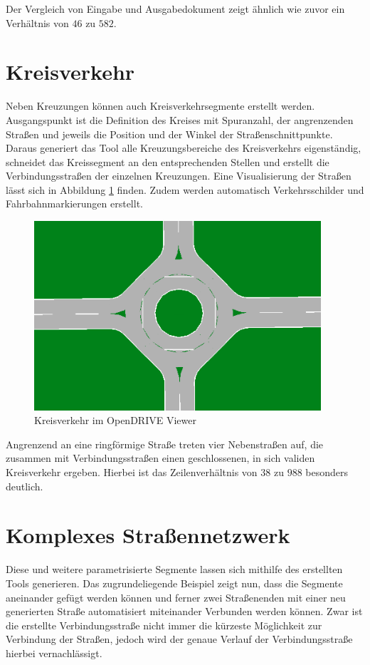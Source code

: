 Der Vergleich von Eingabe und Ausgabedokument zeigt ähnlich wie zuvor ein Verhältnis von \(46\) zu \(582\). 

\section{Kreisverkehr}
Neben Kreuzungen können auch Kreisverkehrsegmente erstellt werden. Ausgangspunkt ist die Definition des Kreises mit Spuranzahl, der angrenzenden Straßen und jeweils die Position und der Winkel der Straßenschnittpunkte. Daraus generiert das Tool alle Kreuzungsbereiche des Kreisverkehrs eigenständig, schneidet das Kreissegment an den entsprechenden Stellen und erstellt die Verbindungsstraßen der einzelnen Kreuzungen. Eine Visualisierung der Straßen lässt sich in Abbildung \ref{abb8} finden. Zudem werden automatisch Verkehrsschilder und Fahrbahnmarkierungen erstellt.

\begin{figure}[H]
\flushleft
\includegraphics[width=0.95\textwidth]{fig/roundabout.png}
\caption{Kreisverkehr im OpenDRIVE Viewer}
\label{abb8}
\end{figure}

Angrenzend an eine ringförmige Straße treten vier Nebenstraßen auf, die zusammen mit Verbindungsstraßen einen geschlossenen, in sich validen Kreisverkehr ergeben. Hierbei ist das Zeilenverhältnis von \(38\) zu \(988\) besonders deutlich.

\section{Komplexes Straßennetzwerk}

Diese und weitere parametrisierte Segmente lassen sich mithilfe des erstellten Tools generieren. Das zugrundeliegende Beispiel zeigt nun, dass die Segmente aneinander gefügt werden können und ferner zwei Straßenenden mit einer neu generierten Straße automatisiert miteinander Verbunden werden können. Zwar ist die erstellte Verbindungsstraße nicht immer die kürzeste Möglichkeit zur Verbindung der Straßen, jedoch wird der genaue Verlauf der Verbindungsstraße hierbei vernachlässigt.

